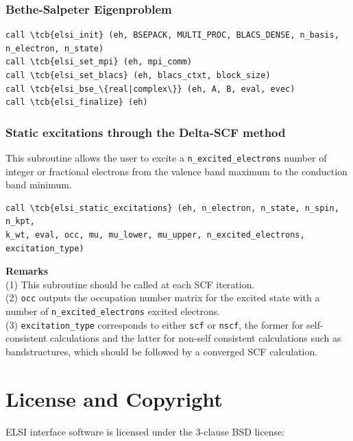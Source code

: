 \documentclass{report}
\newcommand{\tcb}[1]{\textcolor{blue}{#1}}
\begin{document}
\subsection*{Bethe-Salpeter Eigenproblem}
\begin{tcolorbox}
\begin{Verbatim}[commandchars=\\\{\}]
call \tcb{elsi_init} (eh, BSEPACK, MULTI_PROC, BLACS_DENSE, n_basis, n_electron, n_state)
call \tcb{elsi_set_mpi} (eh, mpi_comm)
call \tcb{elsi_set_blacs} (eh, blacs_ctxt, block_size)
call \tcb{elsi_bse_\{real|complex\}} (eh, A, B, eval, evec)
call \tcb{elsi_finalize} (eh)
\end{Verbatim}
\end{tcolorbox}

\subsection*{Static excitations through the Delta-SCF method}

This subroutine allows the user to excite a \texttt{n\_excited\_electrons}
number of integer or fractional electrons from the valence band maximum to
the conduction band minimum.

\begin{tcolorbox}
\begin{Verbatim}[commandchars=\\\{\}]
call \tcb{elsi_static_excitations} (eh, n_electron, n_state, n_spin, n_kpt,
k_wt, eval, occ, mu, mu_lower, mu_upper, n_excited_electrons, excitation_type)
\end{Verbatim}
\end{tcolorbox}

\textbf{Remarks}\\
(1) This subroutine should be called at each SCF iteration.\\
(2) \texttt{occ} outputs the occupation number matrix for the excited state with a number of
\texttt{n\_excited\_electrons} excited electrons. \\
(3) \texttt{excitation\_type} corresponds to either \texttt{scf} or
\texttt{nscf}, the former for self-consistent calculations and the latter
for non-self consistent calculations such as bandstructures, which should
be followed by a converged SCF calculation.

 

\chapter*{License and Copyright}
ELSI interface software is licensed under the 3-clause BSD license:
\end{document}
